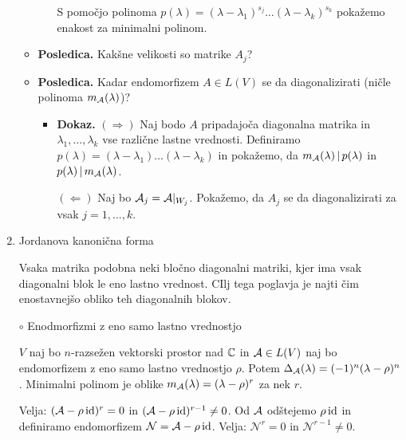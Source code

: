 \begin{enumerate}
\begin{itemize}
\begin{itemize}
            S pomočjo polinoma $p(\lambda) = (\lambda - \lambda_1)^{s_j} \ldots (\lambda - \lambda_k)^{s_k}$ pokažemo enakost za minimalni polinom.
        \end{itemize}
        \item \colorbox{orange!30}{\textbf{Posledica.}} Kakšne velikosti so matrike $A_j$?
        \newpage
        \item \colorbox{orange!30}{\textbf{Posledica.}} Kadar endomorfizem $A \in L(V)$ se da diagonalizirati (ničle polinoma $m_{\mathcal{A}}(\lambda)$)? 
        \begin{itemize}
            \item \colorbox{green!30}{\textbf{Dokaz.}} $(\Rightarrow)$ Naj bodo $A$ pripadajoča diagonalna matrika in $\lambda_1, \ldots, \lambda_k$ vse različne lastne vrednosti. Definiramo $p(\lambda) = (\lambda - \lambda_1) \ldots (\lambda - \lambda_k)$ in pokažemo, da $m_{\mathcal{A}}(\lambda) \, | \, p(\lambda)$ in $p(\lambda) \, | \, m_{\mathcal{A}}(\lambda)$.
            
            $(\Leftarrow)$ Naj bo $\mathcal{A}_j = \mathcal{A}|_{W_j}$. Pokažemo, da $A_j$ se da diagonalizirati za vsak $j = 1, \ldots, k$.
        \end{itemize}       
    \end{itemize}

    \item Jordanova kanonična forma
    
    Vsaka matrika podobna neki bločno diagonalni matriki, kjer ima vsak diagonalni blok le eno lastno vrednost. CIlj tega poglavja je najti čim enostavnejšo obliko teh diagonalnih blokov.

    \item[$\circ$] Enodmorfizmi z eno samo lastno vrednostjo
    
    $V$ naj bo $n$-razsežen vektorski prostor nad $\mathbb{C}$ in $\mathcal{A} \in L(V)$ naj bo endomorfizem z eno samo lastno vrednostjo $\rho$. Potem $\Delta_{\mathcal{A}}(\lambda) = (-1)^n (\lambda - \rho)^n$. Minimalni polinom je oblike $m_{\mathcal{A}} (\lambda) = (\lambda - \rho)^r$ za nek $r$. 
    
    Velja: $(\mathcal{A} - \rho \operatorname{id})^r = 0$ in $(\mathcal{A} - \rho \operatorname{id})^{r-1} \neq 0$. Od $\mathcal{A}$ odštejemo $\rho \operatorname{id}$ in definiramo endomorfizem $\mathcal{N} = \mathcal{A} - \rho \operatorname{id}$. Velja: $\mathcal{N}^r = 0$ in $\mathcal{N}^{r-1} \neq 0$.


\end{enumerate}
